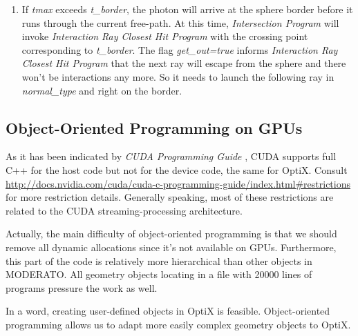 \begin{enumerate}
{  }
  \item{
If \textit{tmax} exceeds \textit{t\_border}, the photon will arrive at the sphere border before it runs through the current free-path. At this time, \textit{Intersection Program} will invoke \textit{Interaction Ray Closest Hit Program} with the crossing point corresponding to \textit{t\_border}. The flag \textit{get\_out=true} informs \textit{Interaction Ray Closest Hit Program} that the next ray will escape from the sphere and there won't be interactions any more. So it needs to launch the following ray in \textit{normal\_type} and right on the border.
  }
\end{enumerate}

\subsection{Object-Oriented Programming on GPUs}
As it has been indicated by \textit{CUDA Programming Guide} \citep{cudaguide}, CUDA supports full C++ for the host code but not for the device code, the same for OptiX. Consult \href{http://docs.nvidia.com/cuda/cuda-c-programming-guide/index.html#restrictions}{http://docs.nvidia.com/cuda/cuda-c-programming-guide/index.html\#restrictions} for more restriction details. Generally speaking, most of these restrictions are related to the CUDA streaming-processing architecture.

Actually, the main difficulty of object-oriented programming is that we should remove all dynamic allocations since it's not available on GPUs. Furthermore, this part of the code is relatively more hierarchical than other objects in MODERATO. All geometry objects locating in a file with 20000 lines of programs pressure the work as well.

In a word, creating user-defined objects in OptiX is feasible. Object-oriented programming allows us to adapt more easily complex geometry objects to OptiX. 
